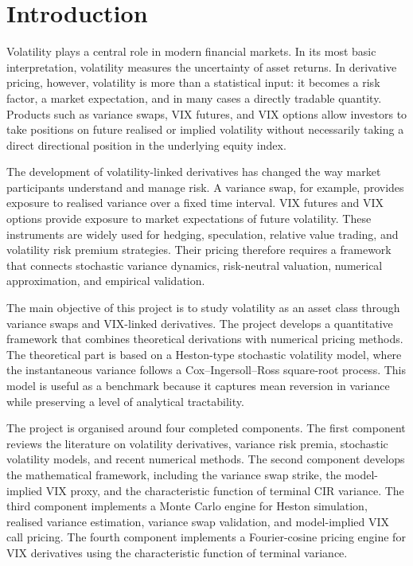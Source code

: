 \section{Introduction}
\label{sec:introduction}

Volatility plays a central role in modern financial markets. In its most basic interpretation, volatility measures the uncertainty of asset returns. In derivative pricing, however, volatility is more than a statistical input: it becomes a risk factor, a market expectation, and in many cases a directly tradable quantity. Products such as variance swaps, VIX futures, and VIX options allow investors to take positions on future realised or implied volatility without necessarily taking a direct directional position in the underlying equity index.

The development of volatility-linked derivatives has changed the way market participants understand and manage risk. A variance swap, for example, provides exposure to realised variance over a fixed time interval. VIX futures and VIX options provide exposure to market expectations of future volatility. These instruments are widely used for hedging, speculation, relative value trading, and volatility risk premium strategies. Their pricing therefore requires a framework that connects stochastic variance dynamics, risk-neutral valuation, numerical approximation, and empirical validation.

The main objective of this project is to study volatility as an asset class through variance swaps and VIX-linked derivatives. The project develops a quantitative framework that combines theoretical derivations with numerical pricing methods. The theoretical part is based on a Heston-type stochastic volatility model, where the instantaneous variance follows a Cox--Ingersoll--Ross square-root process. This model is useful as a benchmark because it captures mean reversion in variance while preserving a level of analytical tractability.

The project is organised around four completed components. The first component reviews the literature on volatility derivatives, variance risk premia, stochastic volatility models, and recent numerical methods. The second component develops the mathematical framework, including the variance swap strike, the model-implied VIX proxy, and the characteristic function of terminal CIR variance. The third component implements a Monte Carlo engine for Heston simulation, realised variance estimation, variance swap validation, and model-implied VIX call pricing. The fourth component implements a Fourier-cosine pricing engine for VIX derivatives using the characteristic function of terminal variance.

